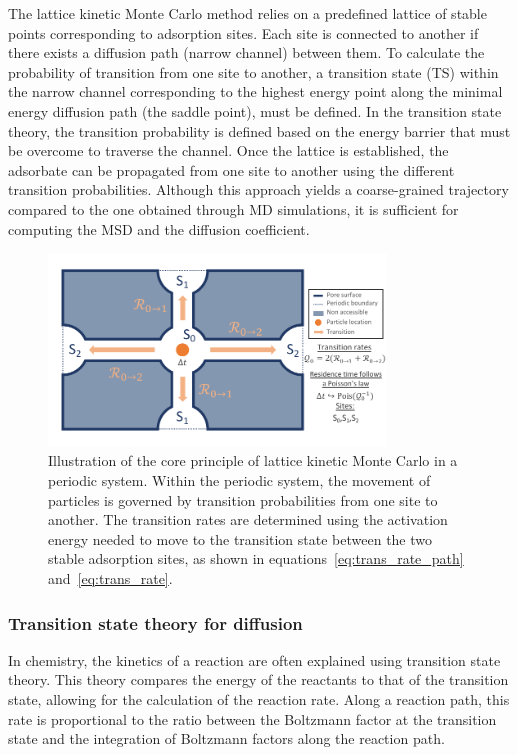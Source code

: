 \documentclass[main]{subfiles}
\begin{document}
The lattice kinetic Monte Carlo method relies on a predefined lattice of stable points corresponding to adsorption sites. Each site is connected to another if there exists a diffusion path (narrow channel) between them. To calculate the probability of transition from one site to another, a transition state (TS) within the narrow channel corresponding to the highest energy point along the minimal energy diffusion path (the saddle point), must be defined. In the transition state theory, the transition probability is defined based on the energy barrier that must be overcome to traverse the channel. Once the lattice is established, the adsorbate can be propagated from one site to another using the different transition probabilities. Although this approach yields a coarse-grained trajectory compared to the one obtained through MD simulations, it is sufficient for computing the MSD and the diffusion coefficient.


\begin{figure}[ht]
  \centering
    \includegraphics[width=0.8\textwidth,trim={0.2cm 0.2cm 0cm 0.7cm},clip]{figures/5-diffusion/kinetic_MC.pdf}
    \caption{Illustration of the core principle of lattice kinetic Monte Carlo in a periodic system. Within the periodic system, the movement of particles is governed by transition probabilities from one site to another. The transition rates are determined using the activation energy needed to move to the transition state between the two stable adsorption sites, as shown in equations~\ref{eq:trans_rate_path} and~\ref{eq:trans_rate}. }\label{fgr:kMC_principle}
\end{figure}

\subsubsection{Transition state theory for diffusion}

In chemistry, the kinetics of a reaction are often explained using transition state theory. This theory compares the energy of the reactants to that of the transition state, allowing for the calculation of the reaction rate. Along a reaction path, this rate is proportional to the ratio between the Boltzmann factor at the transition state and the integration of Boltzmann factors along the reaction path.
\end{document}
